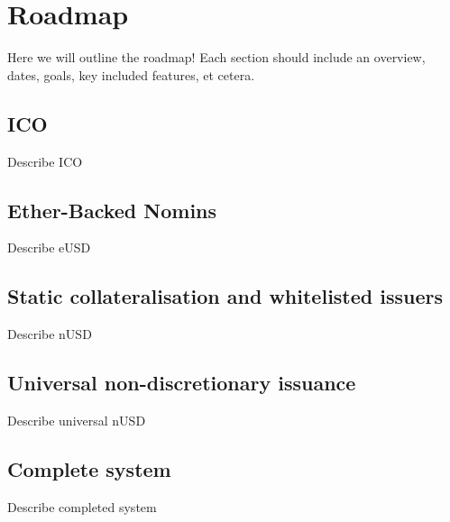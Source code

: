 \section{Roadmap}

Here we will outline the roadmap!
Each section should include an overview, dates, goals, key included features, et cetera.

\subsection{ICO}
Describe ICO

\subsection{Ether-Backed Nomins}
Describe eUSD

\subsection{Static collateralisation and whitelisted issuers}
Describe nUSD

\subsection{Universal non-discretionary issuance}
Describe universal nUSD

\subsection{Complete system}
Describe completed system
